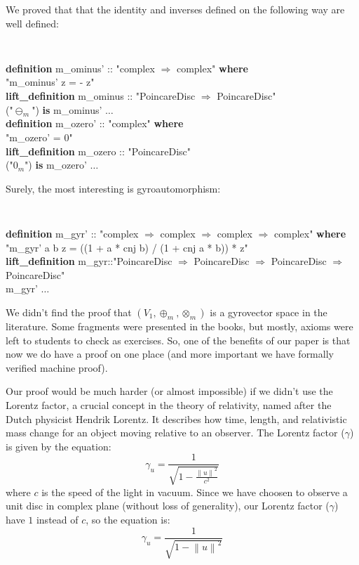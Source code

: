 \documentclass[a4paper]{article}
\newcommand{\tab}{\hspace{5mm}}
\theoremstyle{definition}
\newcommand{\norm}[1]{\left\lVert#1\right\rVert}
\begin{document}
We proved that that the identity and inverses defined on the following way are well defined:

{\tt
\begin{footnotesize}
\begin{tabbing}
{\bf definition} m\_ominus'  :: "complex $\Rightarrow$ complex" {\bf where}\\
\tab  "m\_ominus' z = - z"  \\
{\bf lift\_definition} m\_ominus :: "PoincareDisc $\Rightarrow$ PoincareDisc" \\
\tab ("$\ominus_m$") {\bf is} m\_ominus' $\ldots$\\
{\bf definition}  m\_ozero'  :: "complex" {\bf where}\\
\tab "m\_ozero' = 0"   \\
{\bf lift\_definition} m\_ozero :: "PoincareDisc" \\
\tab ("$0_m$") {\bf is} m\_ozero' $\ldots$\\
\end{tabbing}
\end{footnotesize}
}

Surely, the most interesting is gyroautomorphism:

{\tt
\begin{footnotesize}
\begin{tabbing}
{\bf definition} m\_gyr'  :: "complex $\Rightarrow$ complex  $\Rightarrow$ complex  $\Rightarrow$ complex" {\bf where}\\
\tab  "m\_gyr' a b z = ((1 + a * cnj b) / (1 + cnj a * b)) * z"\\
{\bf lift\_definition} m\_gyr::"PoincareDisc $\Rightarrow$ PoincareDisc $\Rightarrow$ PoincareDisc $\Rightarrow$ PoincareDisc" \\ \tab{\bf is} m\_gyr' $\ldots$\\

\end{tabbing}
\end{footnotesize}
}

We didn't find the proof that $(V_1,\oplus_m,\otimes_m)$ is a gyrovector space in the literature. Some fragments were presented in the books, but mostly, axioms were left to students to check as exercises. So, one of the benefits of our paper is that now we do have a proof on one place (and more important we have formally verified machine proof).

Our proof would be much harder (or almost impossible) if we didn't use the Lorentz factor, a crucial concept in the theory of relativity, named after the Dutch physicist Hendrik Lorentz. It describes how time, length, and relativistic mass change for an object moving relative to an observer. The Lorentz factor ($\gamma$) is given by the equation:
$$\gamma_u = \frac{1}{\sqrt{1-\frac{\norm{u}^2}{c^2}}}$$
where $c$ is the speed of the light in vacuum. Since we have choosen to observe a unit disc in complex plane (without loss of generality), our Lorentz factor ($\gamma$) have $1$ instead of $c$, so the equation is:
$$\gamma_u =\frac{1}{\sqrt{1-\norm{u}^2}}$$
\end{document}
